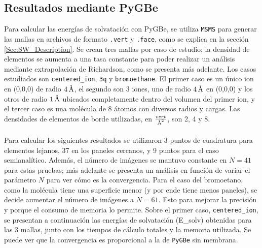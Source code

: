 \documentclass[12pt, oneside, numbers, spanish]{ezthesis}
\numberwithin{equation}{section}
\newcommand{\angstrom}{\text{\normalfont\AA}}
\begin{document}
\subsection{Resultados mediante PyGBe}\label{subsec:resultados_pygbe}
Para calcular las energías de solvatación con PyGBe, se utiliza \texttt{MSMS} para generar las mallas en archivos de formato \texttt{.vert} y \texttt{.face}, como se explica en la sección \ref{Sec:SW_Description}. Se crean tres mallas por caso de estudio; la densidad de elementos se aumenta a una tasa constante para poder realizar un análisis mediante extrapolación de Richardson, como se presenta más adelante. Los casos estudiados son \texttt{centered\_ion}, \texttt{3q} y \texttt{bromoethane}. El primer caso es un único ion en (0,0,0) de radio $4\,\angstrom$, el segundo son 3 iones, uno de radio $4\,\angstrom$ en (0,0,0) y los otros de radio $1\,\angstrom$ ubicados completamente dentro del volumen del primer ion, y el tercer caso es una molécula de 8 átomos con diversos radios y cargas. Las densidades de elementos de borde utilizadas, en $\frac{vert}{\angstrom^2}$, son 2, 4 y 8.\\\\
Para calcular los siguientes resultados se utilizaron 3 puntos de cuadratura para elementos lejanos, 37 en los paneles cercanos, y 9 puntos para el caso semianalítico. Además, el número de imágenes se mantuvo constante en $N=41$ para estas pruebas; más adelante se presenta un análisis en función de variar el parámetro $N$ para ver cómo es la convergencia. Para el caso del bromoetano, como la molécula tiene una superficie menor (y por ende tiene menos paneles), se decide aumentar el número de imágenes a $N=61$. Esto para mejorar la precisión y porque el consumo de memoria lo permite.
Sobre el primer caso, \texttt{centered\_ion}, se presentan a continuación las energías de solvatación (E\_solv) obtenidas para las 3 mallas, junto con los tiempos de cálculo totales y la memoria utilizada. Se puede ver que la convergencia es proporcional a la de \texttt{PyGBe} sin membrana.
\end{document}
